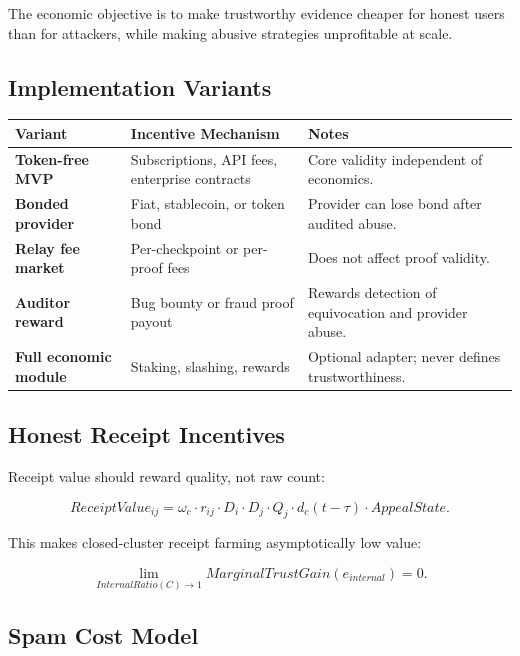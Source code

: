 \documentclass[11pt]{article}
\begin{document}
The economic objective is to make trustworthy evidence cheaper for honest users than for attackers, while making abusive strategies unprofitable at scale.

\subsection{Implementation Variants}

\begin{center}
\begin{tabularx}{\textwidth}{>{\bfseries}p{} p{} X}
\toprule
Variant & Incentive Mechanism & Notes \\
\midrule
Token-free MVP & Subscriptions, API fees, enterprise contracts & Core validity independent of economics. \\
Bonded provider & Fiat, stablecoin, or token bond & Provider can lose bond after audited abuse. \\
Relay fee market & Per-checkpoint or per-proof fees & Does not affect proof validity. \\
Auditor reward & Bug bounty or fraud proof payout & Rewards detection of equivocation and provider abuse. \\
Full economic module & Staking, slashing, rewards & Optional adapter; never defines trustworthiness. \\
\bottomrule
\end{tabularx}
\end{center}

\subsection{Honest Receipt Incentives}

Receipt value should reward quality, not raw count:

\begin{equation}
ReceiptValue_{ij}=\omega_c\cdot r_{ij}\cdot D_i\cdot D_j\cdot Q_j\cdot d_c(t-\tau)\cdot AppealState.
\end{equation}

This makes closed-cluster receipt farming asymptotically low value:

\begin{equation}
\lim_{InternalRatio(C)\rightarrow1}MarginalTrustGain(e_{internal})=0.
\end{equation}

\subsection{Spam Cost Model}
\end{document}
